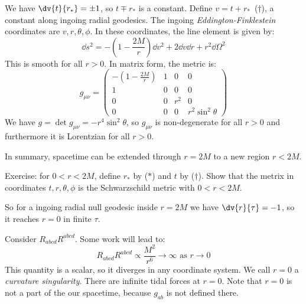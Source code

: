 \documentclass{jknotes}
\begin{document}
\begin{wrapfigure}{l}{0.3\linewidth}
    \centering
\end{wrapfigure}
We have \(\dv{t}{r_*} = \pm1\), so \(t\mp r_*\) is a constant. Define \mbox{\(v = t + r_*\) (\(\dagger\))}, a constant along ingoing radial geodesics. The ingoing \emph{Eddington-Finklestein} coordinates are \(v,r,\theta,\phi\). In these coordinates, the line element is given by:
\begin{equation}
    \dd{s}^2 = - \left( 1-\frac{2M}{r} \right)\dd{v}^2 + 2\dd{v}\dd{r} + r^2\dd{\Omega}^2
\end{equation}
This is smooth for all \(r > 0\). In matrix form, the metric is:
\begin{equation}
    g_{\mu\nu} = 
    \begin{pmatrix}
        - \left( 1 - \frac{2M}{r} \right) & 1 & 0 & 0 \\
        1 & 0 & 0 & 0 \\
        0 & 0 & r^2 & 0 \\
        0 & 0 & 0 & r^2\sin^2\theta
    \end{pmatrix}
\end{equation}
We have \(g = \det g_{\mu\nu} = -r^4\sin^2\theta\), so \(g_{\mu\nu}\) is non-degenerate for all \(r > 0\) and furthermore it is Lorentzian for all \(r>0\).

In summary, spacetime can be extended through \(r=2M\) to a new region \(r<2M\).

Exercise: for \(0<r<2M\), define \(r_*\) by (\(*\)) and \(t\) by (\(\dagger\)). Show that the metrix in coordinates \(t,r,\theta,\phi\) is the Schwarzschild metric with \(0<r<2M\).

So for a ingoing radial null geodesic inside \(r=2M\) we have \(\dv{r}{\tau}=-1\), so it reaches \(r=0\) in finite \(\tau\).

Consider \(R_{abcd}R^{abcd}\). Some work will lead to:
\begin{equation}
    R_{abcd}R^{abcd} \propto \frac{M^2}{r^6} \rightarrow \infty \text{ as } r\rightarrow0
\end{equation}
This quantity is a scalar, so it diverges in any coordinate system. We call \(r=0\) a \emph{curvature singularity}. There are infinite tidal forces at \(r=0\). Note that \(r=0\) is not a part of the our spacetime, because \(g_{ab}\) is not defined there.
\end{document}
